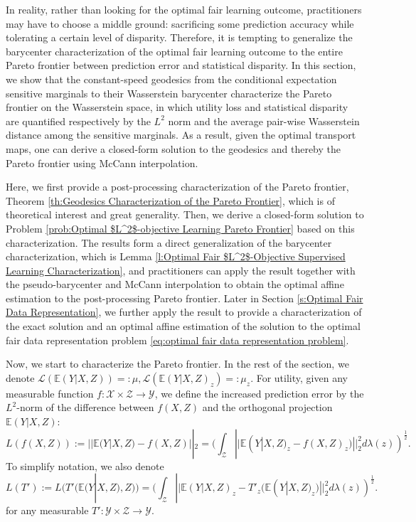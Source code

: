 \documentclass[twoside,11pt]{article}
\begin{document}
In reality, rather than looking for the optimal fair learning outcome, practitioners may have to choose a middle ground: sacrificing some prediction accuracy while tolerating a certain level of disparity. Therefore, it is tempting to generalize the barycenter characterization of the optimal fair learning outcome to the entire Pareto frontier between prediction error and statistical disparity. In this section, we show that the constant-speed geodesics from the conditional expectation sensitive marginals to their Wasserstein barycenter characterize the Pareto frontier on the Wasserstein space, in which utility loss and statistical disparity are quantified respectively by the $L^2$ norm and the average pair-wise Wasserstein distance among the sensitive marginals. As a result, given the optimal transport maps, one can derive a closed-form solution to the geodesics and thereby the Pareto frontier using McCann interpolation.

Here, we first provide a post-processing characterization of the Pareto frontier, Theorem \ref{th:Geodesics Characterization of the Pareto Frontier}, which is of theoretical interest and great generality. Then, we derive a closed-form solution to Problem \ref{prob:Optimal $L^2$-objective Learning Pareto Frontier} based on this characterization. The results form a direct generalization of the barycenter characterization, which is Lemma \ref{l:Optimal Fair $L^2$-Objective Supervised Learning Characterization}, and practitioners can apply the result together with the pseudo-barycenter and McCann interpolation to obtain the optimal affine estimation to the post-processing Pareto frontier. Later in Section \ref{s:Optimal Fair Data Representation}, we further apply the result to provide a characterization of the exact solution and an optimal affine estimation of the solution to the optimal fair data representation problem \eqref{eq:optimal fair data representation problem}.


 Now, we start to characterize the Pareto frontier. 
In the rest of the section, we denote $\mathcal{L}(\mathbb{E}(Y|X,Z)) =: \mu, \mathcal{L}(\mathbb{E}(Y|X,Z)_z) =: \mu_z$.
For utility, given any measurable function $f: \mathcal{X} \times \mathcal{Z} \rightarrow \mathcal{Y}$, we define the increased prediction error by the $L^2$-norm of the difference between $f(X,Z)$ and the orthogonal projection $\mathbb{E}(Y|X,Z)$:
\begin{equation}
L(f(X,Z)) := ||\mathbb{E}(Y|X,Z) - f(X,Z)||_2 = (\int_{\mathcal{Z}} ||\mathbb{E}(Y|X,Z)_z - f(X,Z)_z)||_2^2 d\lambda(z))^{\frac{1}{2}}.
\end{equation}
To simplify notation, we also denote
\begin{equation} \label{d:increased prediction error (L)}
L(T') := L(T'(\mathbb{E}(Y|X,Z),Z)) = (\int_{\mathcal{Z}} ||\mathbb{E}(Y|X,Z)_z - T'_z(\mathbb{E}(Y|X,Z)_z)||_2^2 d\lambda(z))^{\frac{1}{2}}.
\end{equation} 
for any measurable $T': \mathcal{Y} \times \mathcal{Z} \rightarrow \mathcal{Y}$.
\end{document}

